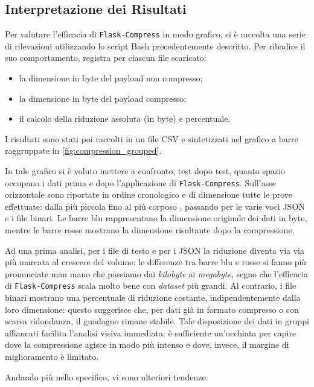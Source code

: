 \subsection{Interpretazione dei Risultati}

Per valutare l'efficacia di \texttt{Flask-Compress} in modo grafico, si è raccolta una serie di rilevazioni utilizzando lo script Bash precedentemente descritto. Per ribadire il suo comportamento, registra per ciascun file scaricato:

\begin{itemize}
  \item la dimensione in byte del payload non compresso;
  \item la dimensione in byte del payload compresso;
  \item il calcolo della riduzione assoluta (in byte) e percentuale.
\end{itemize}

I risultati sono stati poi raccolti in un file CSV e sintetizzati nel grafico a barre raggruppate in \autoref{fig:compression_grouped}. 

In tale grafico si è voluto mettere a confronto, test dopo test, quanto spazio occupano i dati prima e dopo l'applicazione di \texttt{Flask-Compress}. Sull'asse orizzontale sono riportate in ordine cronologico e di dimensione tutte le prove effettuate: dalla più piccola  fino al più corposo , passando per le varie voci JSON e i file binari. Le barre blu rappresentano la dimensione originale dei dati in byte, mentre le barre rosse mostrano la dimensione risultante dopo la compressione.  

Ad una prima analisi, per i file di testo e per i JSON la riduzione diventa via via più marcata al crescere del volume: le differenze tra barre blu e rosse si fanno più pronunciate man mano che passiamo dai \textit{kilobyte} ai \textit{megabyte}, segno che l'efficacia di \texttt{Flask-Compress} scala molto bene con \textit{dataset} più grandi. Al contrario, i file binari mostrano una percentuale di riduzione costante, indipendentemente dalla loro dimensione: questo suggerisce che, per dati già in formato compresso o con scarsa ridondanza, il guadagno rimane stabile. Tale disposizione dei dati in gruppi affiancati facilita l'analisi visiva immediata: è sufficiente un'occhiata per capire dove la compressione agisce in modo più intenso e dove, invece, il margine di miglioramento è limitato.

Andando più nello specifico, vi sono ulteriori tendenze:

